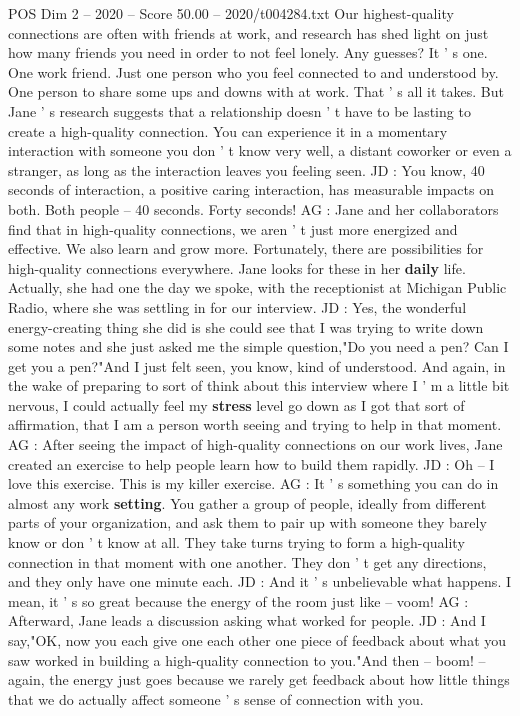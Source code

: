 \begin{textsample}{POS Dim 2 – 2020 – Score 50.00 – 2020/t004284.txt}
Our highest-quality connections are often with friends at work, and research has shed light on just how many friends you need in order to not feel lonely.
Any guesses?
It ' s one.
One work friend.
Just one person who you feel connected to and understood by.
One person to share some ups and downs with at work.
That ' s all it takes.
But Jane ' s research suggests that a relationship doesn ' t have to be lasting to create a high-quality connection.
You can experience it in a momentary interaction with someone you don ' t know very well, a distant coworker or even a stranger, as long as the interaction leaves you feeling seen.
JD : You know, 40 seconds of interaction, a positive caring interaction, has measurable impacts on both.
Both people -- 40 seconds.
Forty seconds!
AG : Jane and her collaborators find that in high-quality connections, we aren ' t just more energized and effective.
We also learn and grow more.
Fortunately, there are possibilities for high-quality connections everywhere.
Jane looks for these in her \textbf{daily} life.
Actually, she had one the day we spoke, with the receptionist at Michigan Public Radio, where she was settling in for our interview.
JD : Yes, the wonderful energy-creating thing she did is she could see that I was trying to write down some notes and she just asked me the simple question,"Do you need a pen?
Can I get you a pen?"And I just felt seen, you know, kind of understood.
And again, in the wake of preparing to sort of think about this interview where I ' m a little bit nervous, I could actually feel my \textbf{stress} level go down as I got that sort of affirmation, that I am a person worth seeing and trying to help in that moment.
AG : After seeing the impact of high-quality connections on our work lives, Jane created an exercise to help people learn how to build them rapidly.
JD : Oh -- I love this exercise.
This is my killer exercise.
AG : It ' s something you can do in almost any work \textbf{setting}.
You gather a group of people, ideally from different parts of your organization, and ask them to pair up with someone they barely know or don ' t know at all.
They take turns trying to form a high-quality connection in that moment with one another.
They don ' t get any directions, and they only have one minute each.
JD : And it ' s unbelievable what happens.
I mean, it ' s so great because the energy of the room just like -- voom!
AG : Afterward, Jane leads a discussion asking what worked for people.
JD : And I say,"OK, now you each give one each other one piece of feedback about what you saw worked in building a high-quality connection to you."And then -- boom! -- again, the energy just goes because we rarely get feedback about how little things that we do actually affect someone ' s sense of connection with you.

\end{textsample}
